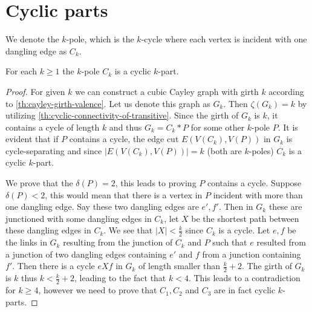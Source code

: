 \documentclass[12pt, twoside]{book}
\begin{document}
\section{Cyclic parts}\label{sec:cyclic-part-results}

We denote the $k$-pole, which is the $k$-cycle where each vertex is incident with one dangling edge as $C_k$.

\begin{lemma}\label{lem:each-cycle-cyclic-part}
	For each $k\geq 1$ the $k$-pole $C_k$ is a cyclic $k$-part. 
\end{lemma}

\begin{proof}
	For given $k$ we can construct a cubic Cayley graph with girth $k$ according to \cref{th:cayley-girth-valence}. Let us denote this graph as $G_k$. Then $\zeta(G_k)=k$ by utilizing \cref{th:cyclic-connectivity-of-transitive}. Since the girth of $G_k$ is $k$, it contains a cycle of length $k$ and thus $G_k=C_k*P$ for some other $k$-pole $P$. It is evident that if $P$ contains a cycle, the edge cut $E(V(C_k), V(P))$ in $G_k$ is cycle-separating and since $|E(V(C_k), V(P))|=k$ (both are $k$-poles) $C_k$ is a cyclic $k$-part.
	
	We prove that the $\delta(P)=2$, this leads to proving $P$ contains a cycle. Suppose $\delta(P)<2$, this would mean that there is a vertex in $P$ incident with more than one dangling edge. Say these two dangling edges are $e',f'$. Then in $G_k$ these are junctioned with some dangling edges in $C_k$, let $X$ be the shortest path between these dangling edges in $C_k$. We see that $|X|<\frac{k}{2}$ since $C_k$ is a cycle. Let $e,f$ be the links in $G_k$ resulting from the junction of $C_k$ and $P$ such that $e$ resulted from a junction of two dangling edges containing $e'$ and $f$ from a junction containing $f'$. Then there is a cycle $eXf$ in $G_k$ of length smaller than $\frac{k}{2}+2$. The girth of $G_k$ is $k$ thus $k<\frac{k}{2}+2$, leading to the fact that $k<4$. This leads to a contradiction for $k\geq 4$, however we need to prove that $C_1,C_2$ and $C_3$ are in fact cyclic $k$-parts.
	

\end{proof}
\end{document}
